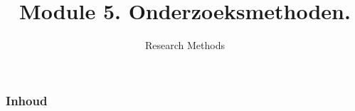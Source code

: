 \documentclass[aspectratio=169]{beamer}
\title{Module 5. Onderzoeksmethoden.}
\subtitle{Research Methods}
\author{\lecturers}   %
\date{\academicyear}
\begin{document}
\begin{frame}
  \maketitle
\end{frame}

\begin{frame}
  \frametitle{Inhoud}

  \tableofcontents
\end{frame}

\end{document}

